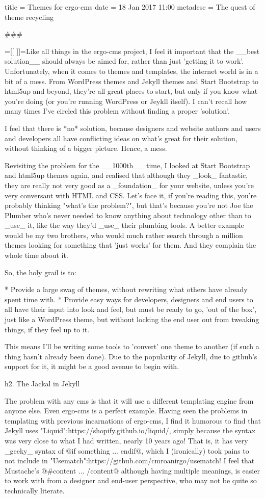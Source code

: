 title = Themes for ergo-cms
date = 18 Jan 2017 11:00
metadesc = The quest of theme recycling

###

{{=[[ ]]=}}Like all things in the ergo-cms project, I feel it important that the __best solution__ should always be aimed for, rather than just 'getting it to work'. Unfortunately, when it comes to themes and templates, the internet world is in a bit of a mess. From WordPress themes and Jekyll themes and Start Bootstrap to html5up and beyond, they're all great places to start, but only if you know what you're doing (or you're running WordPress or Jeykll itself). I can't recall how many times I've circled this problem without finding a proper 'solution'. 

I feel that there is *no* solution, because designers and website authors and users and developers all have conflicting ideas on what's great for their solution, without thinking of a bigger picture. Hence, a mess.

Revisiting the problem for the __1000th__ time, I looked at Start Bootstrap and html5up themes again, and realised that although they _look_ fantastic, they are really not very good as a _foundation_ for your website, unless you're very conversant with HTML and CSS. Let's face it, if you're reading this, you're probably thinking "what's the problem?", but that's because you're not Joe the Plumber who's never needed to know anything about technology other than to _use_ it, like the way they'd _use_ their plumbing tools. A better example would be my two brothers, who would much rather search through a million themes looking for something that 'just works' for them. And they complain the whole time about it.

So, the holy grail is to:

* Provide a large swag of themes, without rewriting what others have already spent time with.
* Provide easy ways for developers, designers and end users to all have their input into look and feel, but must be ready to go, 'out of the box', just like a WordPress theme, but without locking the end user out from tweaking things, if they feel up to it.

This means I'll be writing some tools to 'convert' one theme to another (if such a thing hasn't already been done). Due to the popularity of Jekyll, due to github's support for it, it might be a good avenue to begin with.

h2. The Jackal in Jekyll

The problem with any cms is that it will use a different templating engine from anyone else. Even ergo-cms is a perfect example. Having seen the problems in templating with previous incarnations of ergo-cms, I find it humorous to find that Jekyll uses "Liquid":https://shopify.github.io/liquid/, simply because the syntax was very close to what I had written, nearly 10 years ago! That is, it has very _geeky_ syntax of @if something ... endif@, which I (ironically) took pains to not include in "Usematch":https://github.com/cmroanirgo/usematch! I feel that Mustache's @{{#content}} ... {{/content}}@ although having multiple meanings, is easier to work with from a designer and end-user perspective, who may not be quite so technically literate.

